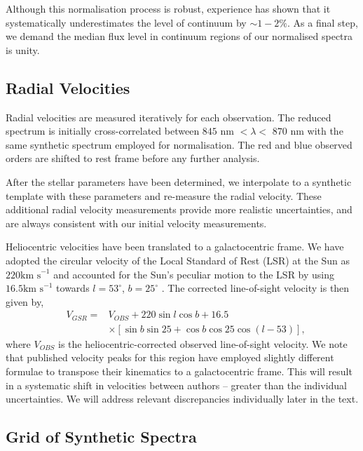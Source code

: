 \documentclass{emulateapj}
\begin{document}
Although this normalisation process is robust, experience has shown that it systematically underestimates the level of continuum by $\sim{1-2}\%$. As a final step, we demand the median flux level in continuum regions of our normalised spectra is unity.

\subsection{Radial Velocities}
Radial velocities are measured iteratively for each observation. The reduced spectrum is initially cross-correlated between $845$ nm $< \lambda <$ $870$ nm with the same synthetic spectrum employed for normalisation. The red and blue observed orders are shifted to rest frame before any further analysis. 

After the stellar parameters have been determined, we interpolate to a synthetic template with these parameters and re-measure the radial velocity. These additional radial velocity measurements provide more realistic uncertainties, and are always consistent with our initial velocity measurements.

Heliocentric velocities have been translated to a galactocentric frame. We have adopted the circular velocity of the Local Standard of Rest (LSR) at the Sun as $220 \mbox{km s}^{-1}$ \citep{Kerr;Lynden-Bell_1986} and accounted for the Sun's peculiar motion to the LSR by using $16.5 \mbox{km s}^{-1}$ towards $l = 53^\circ$, $b = 25^\circ$ \citep{Mihalas;Binney_1981}. The corrected line-of-sight velocity is then given by,
\begin{eqnarray}
	&V_{GSR} = & V_{OBS} + 220\sin{l}\cos{b} + 16.5  \\
	& 		 &\times[\sin{b}\sin{25} + \cos{b}\cos{25}\cos{(l - 53)}], \nonumber
\label{eq:vgsr}
\end{eqnarray}
\noindent{}where $V_{OBS}$ is the heliocentric-corrected observed line-of-sight velocity. We note that published velocity peaks for this region have employed slightly different formulae to transpose their kinematics to a galactocentric frame. This will result in a systematic shift in velocities between authors \--- greater than the individual uncertainties. We will address relevant discrepancies individually later in the text.


\subsection{Grid of Synthetic Spectra}
\end{document}
